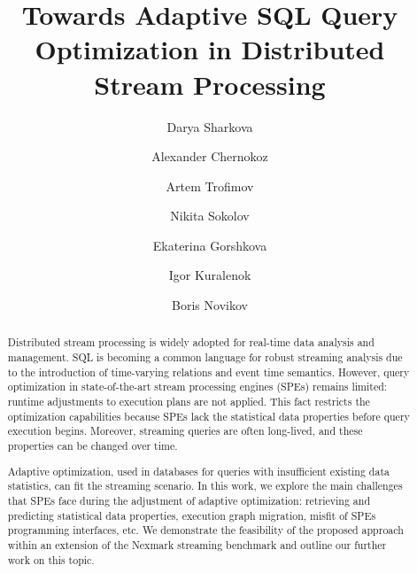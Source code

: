 \documentclass[runningheads]{llncs}
\begin{document}
%
\title{Towards Adaptive SQL Query Optimization in Distributed Stream Processing}
%
%
\author{Darya Sharkova \and
Alexander Chernokoz \and
Artem Trofimov \and
Nikita Sokolov \and
Ekaterina Gorshkova \and
Igor Kuralenok\and
Boris Novikov}
%
%
\maketitle              %
%
\begin{abstract}
Distributed stream processing is widely adopted for real-time data analysis and management. SQL is becoming a common language for robust streaming analysis due to the introduction of time-varying relations and event time semantics. However, query optimization in state-of-the-art stream processing engines (SPEs) remains limited: runtime adjustments to execution plans are not applied. This fact restricts the optimization capabilities because SPEs lack the statistical data properties before query execution begins. Moreover, streaming queries are often long-lived, and these properties can be changed over time. 

Adaptive optimization, used in databases for queries with insufficient existing data statistics, can fit the streaming scenario. In this work, we explore the main challenges that SPEs face during the adjustment of adaptive optimization: retrieving and predicting statistical data properties, execution graph migration, misfit of SPEs programming interfaces, etc. We demonstrate the feasibility of the proposed approach within an extension of the Nexmark streaming benchmark and outline our further work on this topic.

\end{abstract}
\end{document}
